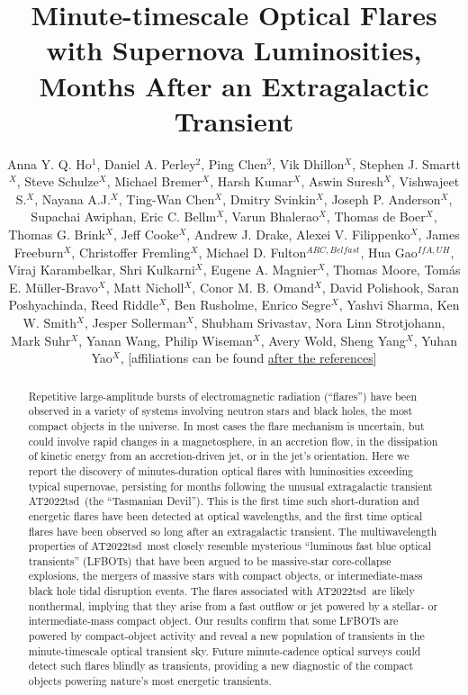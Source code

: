 \documentclass{nature_plusfigure}
\title{Minute-timescale Optical Flares with Supernova Luminosities, Months After an Extragalactic Transient}
\author{Anna Y. Q. Ho$^{1}$, Daniel A. Perley$^{2}$, Ping Chen$^{3}$, Vik Dhillon$^{X}$, Stephen J. Smartt$^X$, Steve Schulze$^{X}$, Michael Bremer$^X$, Harsh Kumar$^X$, Aswin Suresh$^X$, Vishwajeet S.$^X$, Nayana A.J.$^X$, Ting-Wan Chen$^X$, Dmitry Svinkin$^X$,
Joseph P. Anderson$^X$, Supachai Awiphan, Eric C. Bellm$^X$, Varun Bhalerao$^X$, Thomas de Boer$^X$, Thomas G. Brink$^X$, Jeff Cooke$^X$, Andrew J. Drake, Alexei V. Filippenko$^X$, James Freeburn$^X$, Christoffer Fremling$^X$, Michael D. Fulton$^{ARC,Belfast}$, Hua Gao$^{IfA,UH}$, Viraj Karambelkar, Shri Kulkarni$^X$, Eugene A. Magnier$^X$, Thomas Moore, Tom\'as E. M\"uller-Bravo$^X$, Matt Nicholl$^X$, Conor M. B. Omand$^X$, David Polishook, Saran Poshyachinda, Reed Riddle$^X$, Ben Rusholme, Enrico Segre$^X$, Yashvi Sharma, Ken W. Smith$^X$, Jesper Sollerman$^X$, Shubham Srivastav, Nora Linn Strotjohann, Mark Suhr$^X$, Yanan Wang, Philip Wiseman$^X$, Avery Wold, Sheng Yang$^X$, Yuhan Yao$^X$,
[affiliations can be found \hyperref[sec:affiliations]{after the references}]
	}
\newcommand{\at}{AT2022tsd}
\begin{document}
\maketitle

\begin{abstract}

Repetitive large-amplitude bursts of electromagnetic radiation (``flares'') have been observed in a variety of systems involving neutron stars and black holes\cite{Fender1997,Hurley1999,Marrone2008,Racusin2008,Kasliwal2008,CastroTirado2008,Stefanescu2008,Nesci2021}, the most compact objects in the universe. In most cases the flare mechanism is uncertain, but could involve rapid changes in a magnetosphere\cite{Hurley1999,CastroTirado2008,Stefanescu2008}, in an accretion flow\cite{Fender2004,Yuan2014}, in the dissipation of kinetic energy from an accretion-driven jet\cite{Racusin2008}, or in the jet's orientation\cite{Raiteri2017}.
Here we report the discovery of minutes-duration optical flares with luminosities exceeding typical supernovae, persisting for months following the unusual extragalactic transient \at\ (the ``Tasmanian Devil'').
This is the first time such short-duration and energetic flares have been detected at optical wavelengths, and the first time optical flares have been observed so long after an extragalactic transient.
The multiwavelength properties of \at\ most closely resemble mysterious ``luminous fast blue optical transients'' (LFBOTs\cite{Prentice2018,RiveraSandoval2018,Perley2019,Margutti2019,Ho2019,Coppejans2020,Ho2020_Koala,Perley2021,Bright2022,Ho2022_AT2020xnd,Yao2022}) that have been argued to be massive-star core-collapse explosions\cite{Prentice2018,Margutti2019,Perley2019}, the mergers of massive stars with compact objects\cite{Metzger2022}, or intermediate-mass black hole tidal disruption events\cite{Kuin2019,Perley2019}. The flares associated with \at\ are likely nonthermal, implying that they arise from a fast outflow or jet powered by a stellar- or intermediate-mass compact object.
Our results confirm that some LFBOTs are powered by compact-object activity
and reveal a new population of transients in the minute-timescale optical transient sky.
Future minute-cadence optical surveys\cite{Law2022} could detect such flares blindly as transients,
providing a new diagnostic of the compact objects powering nature's most energetic transients.

\end{abstract}
\end{document}
